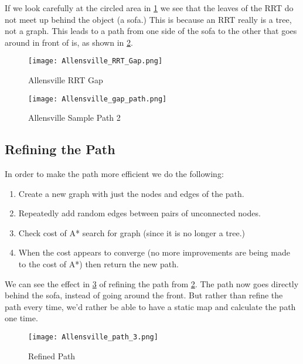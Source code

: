 \documentclass[10pt,twocolumn,letterpaper]{article}
\begin{document}
If we look carefully at the circled area in \ref{fig:gap} we see that
the leaves of the RRT do not meet up behind the object (a sofa.) This
is because an RRT really is a tree, not a graph. This leads to a path
from one side of the sofa to the other that goes around in front of
is, as shown in \ref{fig:path_2}.

\begin{centering}
\begin{figure}[ht]
\caption{Allensville RRT Gap} \centering
\texttt{[image: Allensville\_RRT\_Gap.png]}
\label{fig:gap}
\end{figure}
\end{centering}

\begin{centering}
\begin{figure}[ht]
\caption{Allensville Sample Path 2} \centering
\texttt{[image: Allensville\_gap\_path.png]}
\label{fig:path_2}
\end{figure}
\end{centering}

\subsection{Refining the Path}

In order to make the path more efficient we do the following:

\begin{enumerate}
\item Create a new graph with just the nodes and edges of the path.
\item Repeatedly add random edges between pairs of unconnected nodes.
\item Check cost of A* search for graph (since it is no longer a tree.)
\item When the cost appears to converge (no more improvements are
  being made to the cost of A*) then return the new path.
\end{enumerate}

We can see the effect in \ref{fig:path_3} of refining the path from
\ref{fig:path_2}. The path now goes directly behind the sofa, instead
of going around the front. But rather than refine the path every time,
we'd rather be able to have a static map and calculate the path one time.

\begin{centering}
\begin{figure}[ht]
\caption{Refined Path} \centering
\texttt{[image: Allensville\_path\_3.png]}
\label{fig:path_3}
\end{figure}
\end{centering}
\end{document}

